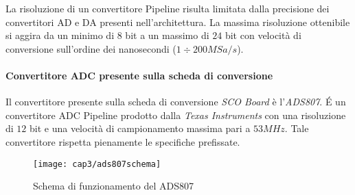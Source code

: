 La risoluzione di un convertitore Pipeline risulta limitata dalla precisione dei convertitori AD e DA presenti nell'architettura. La massima risoluzione ottenibile si aggira da un minimo di $8$ bit a un massimo di $24$ bit  con velocità di conversione sull'ordine dei nanosecondi ($1 \div 200 MSa/s$). 

\paragraph{Convertitore ADC presente sulla scheda di conversione}
Il convertitore presente sulla scheda di conversione \textit{SCO Board} è l'\textit{ADS807}. \'E un convertitore ADC Pipeline prodotto dalla \textit{Texas Instruments} con una risoluzione di $12$ bit e una velocità di campionamento massima pari a $53MHz$. Tale convertitore rispetta pienamente le specifiche prefissate.

\begin{figure}  
  \begin{center}
    \texttt{[image: cap3/ads807schema]}
    \caption{Schema di funzionamento del ADS807}
    \label{ads807schema}
  \end{center}
\end{figure}

